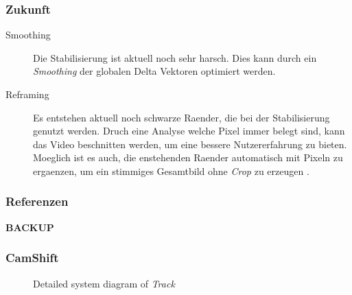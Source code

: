 \documentclass{beamer}
\begin{document}
\begin{frame}
\frametitle{Zukunft}
    \begin{description}
        \item[Smoothing] Die Stabilisierung ist aktuell noch sehr harsch. Dies kann durch ein \textit{Smoothing} der globalen Delta Vektoren optimiert werden.
        \item[Reframing] Es entstehen aktuell noch schwarze Raender, die bei der Stabilisierung genutzt werden. Druch eine Analyse welche Pixel immer belegt sind, kann das Video beschnitten werden, um eine bessere Nutzererfahrung zu bieten. Moeglich ist es auch, die enstehenden Raender automatisch mit Pixeln zu ergaenzen, um ein stimmiges Gesamtbild ohne \textit{Crop} zu erzeugen \cite{blockTang}.
    \end{description}
\end{frame}

\begin{frame}%
\frametitle{Referenzen}
    \printbibliography[heading=none]
\end{frame}

\begin{frame}
\begin{center}
    \textbf{\huge BACKUP}
\end{center}
\end{frame}

\begin{frame}
    \frametitle{CamShift}
    \begin{figure}[h!]
        \resizebox{\textwidth}{!}{%
        }
        \caption{Detailed system diagram of \textit{Track}}
    \end{figure}
\end{frame}
\end{document}

